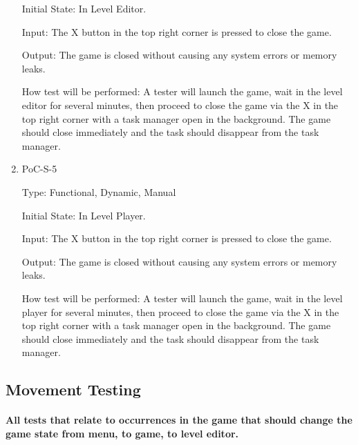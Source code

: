 \documentclass[12pt, titlepage]{article}
\begin{document}
\begin{enumerate}
Initial State: In Level Editor.
					
Input: The X button in the top right corner is pressed to close the game.
					
Output: The game is closed without causing any system errors or memory leaks.
					
How test will be performed: A tester will launch the game, wait in the level editor for several minutes, then proceed to close the game via the X in the top right corner with a task manager open in the background. The game should close immediately and the task should disappear from the task manager.


\item{PoC-S-5\\}

Type: Functional, Dynamic, Manual
					
Initial State: In Level Player.
					
Input: The X button in the top right corner is pressed to close the game.
					
Output: The game is closed without causing any system errors or memory leaks.
					
How test will be performed: A tester will launch the game, wait in the level player for several minutes, then proceed to close the game via the X in the top right corner with a task manager open in the background. The game should close immediately and the task should disappear from the task manager.

\end{enumerate}

\subsection{Movement Testing}
		
\paragraph{All tests that relate to occurrences in the game that should change the game state from menu, to game, to level editor.}
\end{document}
